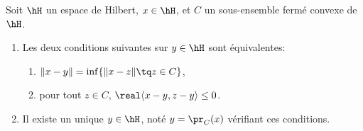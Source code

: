 \begin{theorem} \label{ThoProjOrthuzcYkz}
    Soit \( \hH\) un espace de Hilbert, \( x\in \hH\), et \( C\) un sous-ensemble fermé convexe de \( \hH\).
    \begin{enumerate}
        \item
            Les deux conditions suivantes sur \( y\in \hH\) sont équivalentes:
    \begin{enumerate}
        \item   \label{ETsfYCSItemi}
            \( \| x-y \|=\inf\{ \| x-z \|\tq z\in C \}\),
        \item\label{ETsfYCSItemii}
            pour tout \( z\in C\), \( \real\langle x-y, z-y\rangle \leq 0\).
    \end{enumerate}
\item
    Il existe un unique \( y\in \hH\), noté \( y=\pr_C(x)\) vérifiant ces conditions.
    \end{enumerate}
\end{theorem}


